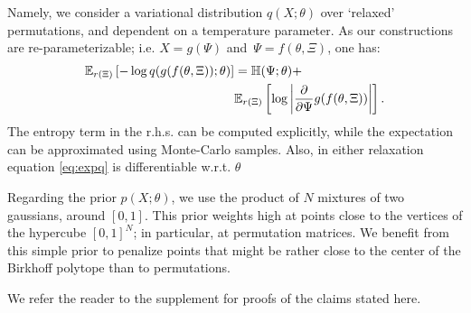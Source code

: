 \documentclass[twoside]{article}
\begin{document}
Namely, we consider a variational distribution $q(X;\theta)$ over `relaxed' permutations, and dependent on a temperature parameter. As our constructions are re-parameterizable; i.e.  ${X = g(\Psi)}$ and~${\Psi = f(\theta,
  \Xi)}$, one has:
  \begin{align}
  \label{eq:expq}
  \mathbb{E}_{r(\Xi)} \left[- \log q(g(f(\theta, \Xi)); \theta) \right]
  &= \mathbb{H}(\Psi; \theta)+ \\
 \nonumber  & \mathbb{E}_{r(\Xi)}\left[\log \left|\frac{\partial}{\partial \Psi} g(f(\theta, \Xi)) \right| \right].
  \end{align}
The entropy term in the r.h.s. can be computed explicitly, while the expectation can be approximated using Monte-Carlo samples. Also, in either relaxation equation \ref{eq:expq} is differentiable w.r.t. $\theta$

Regarding the prior $p(X;\theta)$, we use the product of $N$ mixtures of two gaussians, around $[0,1]$. This prior weights high at points close to the vertices of the hypercube $[0,1]^N$; in particular, at permutation matrices. We benefit from this simple prior to penalize points that might be rather close to the center of the Birkhoff polytope than to permutations.

We refer the reader to the supplement for proofs of the claims stated here.


\end{document}
